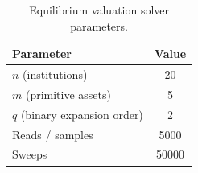 \documentclass[aps,reprint,superscriptaddress,pra]{revtex4-2}
\begin{document}
\begin{table}[H]
\centering
\caption{Equilibrium valuation solver parameters.}
\label{tab:eq_params}
\begin{tabular}{lc}
\hline\hline
Parameter & Value \\
\hline
$n$ (institutions)            & 20    \\
$m$ (primitive assets)        & 5     \\
$q$ (binary expansion order)  & 2     \\
Reads / samples               & 5000  \\
Sweeps                        & 50000 \\
\hline\hline
\end{tabular}
\end{table}
\end{document}
